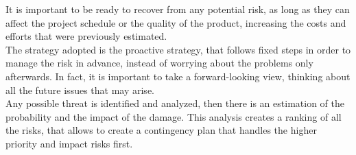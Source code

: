 	It is important to be ready to recover from any potential risk, as long as they can affect the project schedule or the quality of the product, increasing the costs and efforts that were previously estimated.\\ The strategy adopted is the proactive strategy, that follows fixed steps in order to manage the risk in advance, instead of worrying about the problems only afterwards. In fact, it is important to take a forward-looking view, thinking about all the future issues that may arise.\\ Any possible threat is identified and analyzed, then there is an estimation of the probability and the impact of the damage. This analysis creates a ranking of all the risks, that allows to create a contingency plan that handles the higher priority and impact risks first.